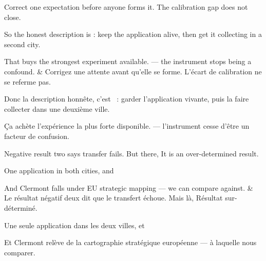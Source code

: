 \documentclass[10pt,a4paper]{article}
\begin{document}
\begin{say}
Correct one expectation before anyone forms it.  The calibration gap does not close.

So the honest description is : keep the
application alive, then get it collecting in a second city.

That buys the strongest experiment available.  --- the instrument stops being a confound.
&
Corrigez une attente avant qu'elle se forme.  L'écart de calibration ne se referme pas.

Donc la description honnête, c'est ~: garder
l'application vivante, puis la faire collecter dans une deuxième ville.

Ça achète l'expérience la plus forte disponible.  --- l'instrument cesse d'être un facteur de confusion.
\end{say}

\begin{say}
Negative result two says transfer fails. But there,  It is an over-determined
result.

One application in both cities, and 

And Clermont falls under EU strategic mapping ---  we can compare against.
&
Le résultat négatif deux dit que le transfert échoue. Mais là,  Résultat sur-déterminé.

Une seule application dans les deux villes, et 

Et Clermont relève de la cartographie stratégique européenne ---  à laquelle nous comparer.
\end{say}
\end{document}
